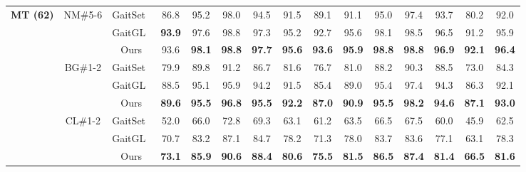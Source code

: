 \documentclass[runningheads]{llncs}
\begin{document}
\begin{table*}[ht]
{\begin{tabular}{c|c|c|c|c|c|c|c|c|c|c|c|c|c|c}
    \hline
    \multicolumn{1}{c|}{\multirow{9}[2]{*}{\textbf{MT (62)}}} & \multicolumn{1}{c|}{\multirow{3}[2]{*}{NM\#5-6}} & GaitSet~\cite{aaai2019gaitset} & 86.8  & 95.2  & 98.0  & 94.5  & 91.5  & 89.1  & 91.1  & 95.0  & 97.4  & 93.7  & 80.2  & 92.0   \\
\cline{3-15}          &       & \multicolumn{1}{c|}{GaitGL~\cite{gaitgl}} & \textbf{93.9} & 97.6  & 98.8  & 97.3  & 95.2  & 92.7  & 95.6  & 98.1  & 98.5  & 96.5  & 91.2  & 95.9   \\
\cline{3-15}          &       & Ours  & 93.6  & \textbf{98.1} & \textbf{98.8} & \textbf{97.7} & \textbf{95.6} & \textbf{93.6} & \textbf{95.9} & \textbf{98.8} & \textbf{98.8} & \textbf{96.9} & \textbf{92.1} & \textbf{96.4}  \\
\cline{2-15}          & \multicolumn{1}{c|}{\multirow{3}[2]{*}{BG\#1-2}} & GaitSet~\cite{aaai2019gaitset} & 79.9  & 89.8  & 91.2  & 86.7  & 81.6  & 76.7  & 81.0  & 88.2  & 90.3  & 88.5  & 73.0  & 84.3   \\
\cline{3-15}          &       & \multicolumn{1}{c|}{GaitGL~\cite{gaitgl}} & 88.5  & 95.1  & 95.9  & 94.2  & 91.5  & 85.4  & 89.0  & 95.4  & 97.4  & 94.3  & 86.3  & 92.1   \\
\cline{3-15}          &       & Ours  & \textbf{89.6} & \textbf{95.5} & \textbf{96.8} & \textbf{95.5} & \textbf{92.2} & \textbf{87.0} & \textbf{90.9} & \textbf{95.5} & \textbf{98.2} & \textbf{94.6} & \textbf{87.1} & \textbf{93.0}  \\
\cline{2-15}          & \multicolumn{1}{c|}{\multirow{3}[2]{*}{CL\#1-2}} & GaitSet~\cite{aaai2019gaitset} & 52.0  & 66.0  & 72.8  & 69.3  & 63.1  & 61.2  & 63.5  & 66.5  & 67.5  & 60.0  & 45.9  & 62.5   \\
\cline{3-15}          &       & \multicolumn{1}{c|}{GaitGL~\cite{gaitgl}} & 70.7  & 83.2  & 87.1  & 84.7  & 78.2  & 71.3  & 78.0  & 83.7  & 83.6  & 77.1  & 63.1  & 78.3   \\
\cline{3-15}          &       & Ours  & \textbf{73.1} & \textbf{85.9} & \textbf{90.6} & \textbf{88.4} & \textbf{80.6} & \textbf{75.5} & \textbf{81.5} & \textbf{86.5} & \textbf{87.4} & \textbf{81.4} & \textbf{66.5} & \textbf{81.6}  \\
    \hline


\end{tabular}}
\end{table*}
\end{document}
